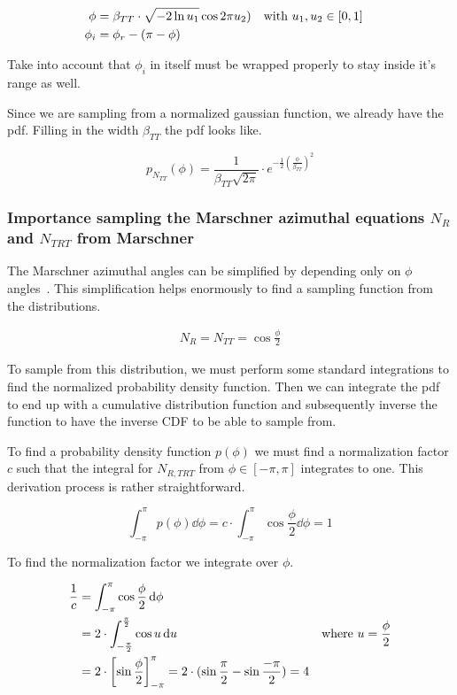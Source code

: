 \documentclass[12pt,a4paper,twoside]{article}
\begin{document}
\begin{align}
\phi & = \beta_{TT} \cdot \sqrt{-2 \ln u_1} \cos 2\pi u_2) & \textnormal{with $u_1, u_2 \in [0, 1]$}  \\
\phi_i & = \phi_r - (\pi - \phi) &&
\end{align}


Take into account that $\phi_i$ in itself must be wrapped properly to stay inside it's range as well.

Since we are sampling from a normalized gaussian function, we already have the pdf. Filling in the width $\beta_{TT}$ the pdf looks like.

\begin{equation}
p_{N_{TT}}(\phi) = \frac{1}{\beta_{TT} \sqrt{2\pi}} \cdot e^{-\frac{1}{2}(\frac{\phi}{\beta_{TT}})^2}
\end{equation}


\subsubsection*{Importance sampling the Marschner azimuthal equations $N_R$ and $N_{TRT}$ from Marschner}

The Marschner azimuthal angles can be simplified by depending only on $\phi$ angles~\cite{sadeghi:10}. This simplification helps enormously to find a sampling function from the distributions.

\begin{align}
N_R = N_{TT} = \cos \frac{\phi}{2}
\end{align}

To sample from this distribution, we must perform some standard integrations to find the normalized probability density function. Then we can integrate the pdf to end up with a cumulative distribution function and subsequently inverse the function to have the inverse CDF to be able to sample from.

To find a probability density function $p(\phi)$ we must find a normalization factor $c$ such that the integral for $N_{R, TRT}$ from $\phi \in [-\pi, \pi]$ integrates to one. This derivation process is rather straightforward.

\begin{equation}
\int_{-\pi}^{\pi} p(\phi) \dd{\phi} = c \cdot \int_{-\pi}^{\pi} \cos \frac{\phi}{2} \dd{\phi} = 1
\end{equation}

To find the normalization factor we integrate over $\phi$.

\begin{align}
\frac{1}{c} & = \int_{-\pi}^{\pi} \cos \frac{\phi}{2} \dd{\phi} \\
 & = 2 \cdot \int_{-\frac{\pi}{2}}^\frac{\pi}{2} \cos u \dd{u}  & \textnormal{where  $u = \frac{\phi}{2}$}\\
 & = 2 \cdot \left[ \sin \frac{\phi}{2} \right]_{-\pi}^{\pi} = 2 \cdot (\sin \frac{\pi}{2} - \sin \frac{-\pi}{2}) = 4
\end{align}
\end{document}
